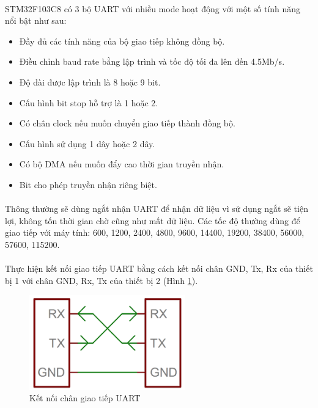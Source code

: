 \paragraph{}
STM32F103C8 có 3 bộ UART với nhiều mode hoạt động với một số tính năng nổi bật như sau:
\begin{itemize}
    \item Đầy đủ các tính năng của bộ giao tiếp không đồng bộ.
    \item Điều chỉnh baud rate bằng lập trình và tốc độ tối đa lên đến 4.5Mb/s.
    \item Độ dài được lập trình là 8 hoặc 9 bit.
    \item Cấu hình bit stop hỗ trợ là 1 hoặc 2.
    \item Có chân clock nếu muốn chuyển giao tiếp thành đồng bộ.
    \item Cấu hình sử dụng 1 dây hoặc 2 dây.
    \item Có bộ DMA nếu muốn đẩy cao thời gian truyền nhận.
    \item Bit cho phép truyền nhận riêng biệt.
\end{itemize}

\paragraph{}
Thông thường sẽ dùng ngắt nhận UART để nhận dữ liệu vì sử dụng ngắt sẽ tiện lợi, không tốn thời gian chờ cũng như mất dữ liệu. Các tốc độ thường dùng để giao tiếp với máy tính: 600, 1200, 2400, 4800, 9600, 14400, 19200, 38400, 56000, 57600, 115200. 

\paragraph{}
Thực hiện kết nối giao tiếp UART bằng cách kết nối chân GND, Tx, Rx của thiết bị 1 với chân GND, Rx, Tx của thiết bị 2 (Hình \ref{fig:uart-wiring}).
\begin{figure}[H]
    \centering
    \includegraphics[width=0.6\textwidth]{images/Untitled.png}
    \caption{Kết nối chân giao tiếp UART}
    \label{fig:uart-wiring}
\end{figure}
